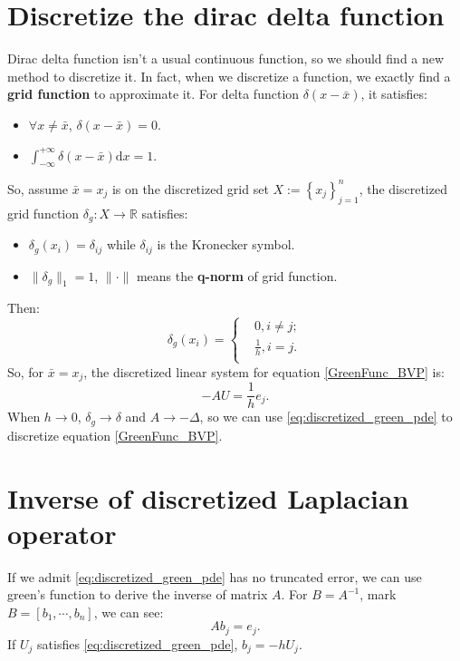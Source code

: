 \documentclass{article}
\theoremstyle{plain}
\theoremstyle{definition}
\theoremstyle{remark}
\newcommand{\dif}{\mathrm{d}}
\begin{document}
\section{Discretize the dirac delta function}
Dirac delta function isn't a usual continuous function, so we should find a new method to discretize it. In fact, when we discretize a function, we exactly find a \textbf{grid function} to approximate it. For delta function $\delta(x-\bar{x})$, it satisfies:
\begin{itemize}
    \item $\forall x\neq \bar{x}$, $\delta(x-\bar{x})=0$.
    \item $\int_{-\infty}^{+\infty}\delta(x-\bar{x})\dif x=1$.
\end{itemize}
So, assume $\bar{x}=x_{j}$ is on the discretized grid set $X:=\left\{x_{j}\right\}_{j=1}^{n}$, the discretized grid function $\delta_{g}:X\rightarrow\mathbb{R}$ satisfies:
\begin{itemize}
    \item $\delta_{g}(x_{i})=\delta_{ij}$ while $\delta_{ij}$ is the Kronecker symbol.
    \item $\|\delta_{g}\|_{1}=1$, $\|\cdot\|$ means the \textbf{q-norm} of grid function.
\end{itemize}
Then:
\begin{equation}
    \label{eq:discretized_delta}
    \delta_{g}(x_{i})=\left\{
        \begin{aligned}
        &0, i\neq j;\\
        &\frac{1}{h}, i=j.\\
        \end{aligned}
    \right.
\end{equation}
So, for $\bar{x}=x_{j}$, the discretized linear system for equation \eqref{GreenFunc_BVP} is:
\begin{equation}
    \label{eq:discretized_green_pde}
    -AU=\frac{1}{h}e_{j}.
\end{equation}
When $h\rightarrow 0$, $\delta_{g}\rightarrow \delta$ and $A\rightarrow -\Delta$, so we can use \eqref{eq:discretized_green_pde} to discretize equation \eqref{GreenFunc_BVP}.
\section{Inverse of discretized Laplacian operator}

If we admit \eqref{eq:discretized_green_pde} has no truncated error, we can use green's function to derive the inverse of matrix $A$. For $B=A^{-1}$, mark $B=[b_{1},\cdots,b_{n}]$, we can see:
\begin{equation}
    Ab_{j}=e_{j}.
\end{equation}
If $U_{j}$ satisfies \eqref{eq:discretized_green_pde}, $b_{j}=-h U_{j}$.
\end{document}
